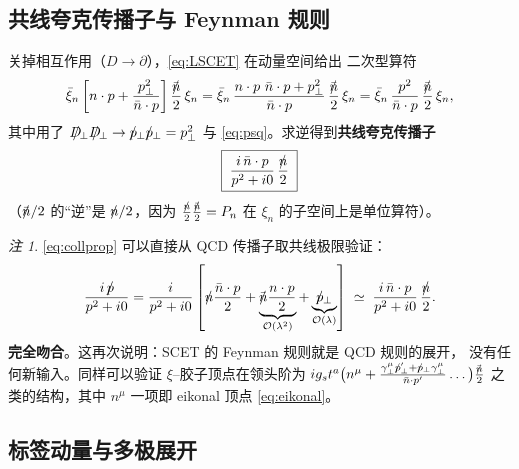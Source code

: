 \documentclass[UTF8,a4paper,11pt]{ctexart}
\theoremstyle{definition}
\theoremstyle{remark}
\newtheorem{remark}{注}[section]
\theoremstyle{plain}
\newcommand{\nsl}{n\mkern-10.5mu/\mkern1.5mu}
\newcommand{\nbsl}{\bar{n}\mkern-10.5mu/\mkern1.5mu}
\newcommand{\Dsl}{D\mkern-11.5mu/}
\newcommand{\psl}{p\mkern-9.5mu/}
\begin{document}
\subsection{共线夸克传播子与 Feynman 规则}
\label{subsec:scetrules}

关掉相互作用（$D\to\partial$），\eqref{eq:LSCET} 在动量空间给出
二次型算符
\begin{equation}
  \bar\xi_n\left[n\cdot p+\frac{p_\perp^2}{\bar n\cdot p}\right]
  \frac{\nbsl}{2}\,\xi_n
  =\bar\xi_n\,\frac{n\cdot p\,\,\bar n\cdot p+p_\perp^2}{\bar n\cdot p}\,
  \frac{\nbsl}{2}\,\xi_n
  =\bar\xi_n\,\frac{p^2}{\bar n\cdot p}\,\frac{\nbsl}{2}\,\xi_n ,
\end{equation}
其中用了 $\Dsl_\perp\Dsl_\perp\to \psl_\perp\psl_\perp=p_\perp^2$ 与
\eqref{eq:psq}。求逆得到\textbf{共线夸克传播子}
\begin{equation}
  \boxed{\;
  \frac{i\,\bar n\cdot p}{p^2+i0}\,\frac{\nsl}{2}\;}
  \label{eq:collprop}
\end{equation}
（$\nbsl/2$ 的“逆”是 $\nsl/2$，因为 $\frac{\nsl}{2}\frac{\nbsl}{2}=P_n$
在 $\xi_n$ 的子空间上是单位算符）。

\begin{remark}
\eqref{eq:collprop} 可以直接从 QCD 传播子取共线极限验证：
\begin{equation}
  \frac{i\,\psl}{p^2+i0}
  =\frac{i}{p^2+i0}\left[\nsl\frac{\bar n\cdot p}{2}
   +\underbrace{\nbsl\frac{n\cdot p}{2}}_{\mathcal O(\lambda^2)}
   +\underbrace{\psl_\perp}_{\mathcal O(\lambda)}\right]
  \;\simeq\;\frac{i\,\bar n\cdot p}{p^2+i0}\,\frac{\nsl}{2} .
\end{equation}
\textbf{完全吻合}。这再次说明：SCET 的 Feynman 规则就是 QCD 规则的展开，
没有任何新输入。同样可以验证 $\xi$--胶子顶点在领头阶为
$ig_s t^a\big(n^\mu+\frac{\gamma_\perp^\mu\psl_\perp'
+\psl_\perp\gamma_\perp^\mu}{\bar n\cdot p'}\dots\big)\frac{\nbsl}{2}$
之类的结构，其中 $n^\mu$ 一项即 eikonal 顶点 \eqref{eq:eikonal}。
\end{remark}

\subsection{标签动量与多极展开}
\label{subsec:label}
\end{document}
